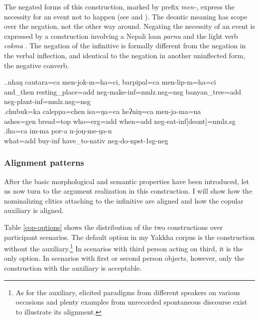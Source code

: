 The negated forms of this construction, marked by prefix \emph{men-}, express the necessity for an event not to happen (see \Next[a] and \Next[b]). The deontic meaning has scope over the negation, not the other  way around. Negating  the  necessity of an event is expressed by a construction involving a Nepali loan \emph{parnu}  and the light verb \emph{cokma}  \Next[c].  The negation of the infinitive is formally different from the negation in the verbal inflection, and identical to the negation in another uninflected form, the negative converb.

\ex.\ag.nhaŋ     cautara=ca  men-jok-m=ha=ci,  barpipal=ca  men-lip-m=ha=ci\\
and\_then resting\_place{\sc =add} {\sc neg-}make{\sc -inf=nmlz.nsg=nsg} banyan\_tree{\sc =add} {\sc neg-}plant{\sc -inf=nmlz.nsg=nsg} \\
\bg.chubuk=ka    caleppa=chen   isa=ŋa=ca          heʔniŋ=ca        men-ja-ma=na\\
ashes{\sc =gen} bread{\sc =top} who{\sc =erg=add} when{\sc =add} {\sc neg-}eat{\sc -inf[deont]=nmlz.sg}\\
 
\bg.iha=ca  im-ma     por-a           n-joŋ-me-ŋa-n\\
what{\sc =add} buy{\sc -inf} have\_to{\sc -nativ} {\sc neg-}do{\sc -npst-1sg-neg}\\
  



\subsubsection{Alignment patterns}

After the basic morphological and semantic properties have been introduced, let us now turn to the argument realization in this construction. I will show how the nominalizing clitics attaching to the infinitive are aligned and how the copular auxiliary is aligned. 

Table \ref{cop-options} shows the distribution of the two constructions over participant scenarios. The default option in my Yakkha corpus  is the construction without the auxiliary.\footnote{As for the auxiliary, elicited paradigms from different speakers on various occasions and plenty examples from unrecorded spontaneous discourse exist to illustrate its alignment.} In scenarios with third person acting on third, it is the only option. In scenarios with first or second person objects, however, only the construction with the auxiliary is acceptable.

